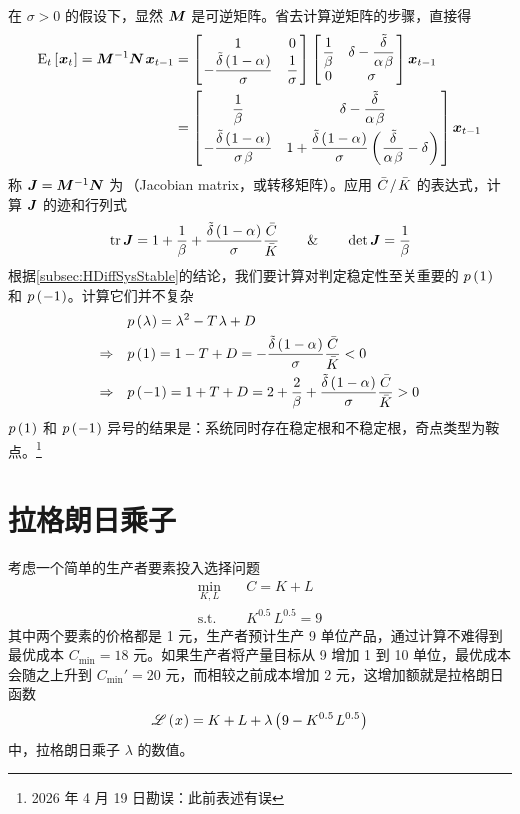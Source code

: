 在 \(\sigma>0\) 的假设下，显然 \(\bm{M}\) 是可逆矩阵。省去计算逆矩阵的步骤，直接得
\begin{align*}
    \mean_t\bks{\bs x_t}=\bs{M}\inv\bs{N}\,\bs x\lt&=
    \matbks{1&0\\-\dfrac{\tilde\delta\bka{1-\alpha}}{\sigma}&\dfrac1\sigma}\matbks{\dfrac1\beta&\delta-\dfrac{\tilde\delta}{\alpha\,\beta}\\0&\sigma}\bs x\lt\\
    &=\matbks{\dfrac1\beta&\delta-\dfrac{\tilde\delta}{\alpha\,\beta}\\[2ex]-\dfrac{\tilde\delta\bka{1-\alpha}}{\sigma\,\beta}&1+\dfrac{\tilde\delta\bka{1-\alpha}}{\sigma}\bka{\dfrac{\tilde\delta}{\alpha\,\beta}-\delta}}\bs x\lt
\end{align*}
称 \(\bm{J}=\bm{M}^{-1}\bm{N}\) 为\,（Jacobian matrix，或转移矩阵）。应用 \(\bar C{\mspace{2mu}}/{\mspace{2mu}}\bar K\) 的表达式，计算 \(\bm{J}\) 的迹和行列式
\begin{align*}
    \operatorname{tr}\bm{J}=1+\dfrac1\beta+\dfrac{\tilde\delta\left(\mspace{1mu}1-\alpha\mspace{1mu}\right)}{\sigma}\dfrac{\bar{C}}{\bar{K}}\qquad \& \qquad\det\bm{J}=\dfrac1\beta
\end{align*}
根据\ref{subsec:HDiffSysStable}的结论，我们要计算对判定稳定性至关重要的 \(p\left(\mspace{1mu}1\mspace{1mu}\right)\) 和 \(p\left(\mspace{1mu}-1\mspace{1mu}\right)\)。计算它们并不复杂
\begin{align*}
    &p\bka\lambda=\lambda^2-T\,\lambda+D\\
    \Rightarrow\quad &p\bka{1}=1-T+D=-\dfrac{\tilde\delta\bka{1-\alpha}}{\sigma}\dfracb{C}{K}<0\\
    \Rightarrow\quad &p\bka{-1}=1+T+D=2+\dfrac2\beta+\dfrac{\tilde\delta\bka{1-\alpha}}{\sigma}\dfracb{C}{K}>0
\end{align*}
\(p\left(\mspace{1mu}1\mspace{1mu}\right)\) 和 \(p\left(\mspace{1mu}-1\mspace{1mu}\right)\) 异号的结果是：系统同时存在稳定根和不稳定根，奇点类型为鞍点。\footnote{2026 年 4 月 19 日勘误：此前表述有误}



\BeginChapterAppendix

\section{拉格朗日乘子}\label{sec:LagMult}

考虑一个简单的生产者要素投入选择问题
\begin{align*}
    \min_{K,L} \quad & C=K+L\\
    \text{s.t.} \quad & K^{0.5}\,L^{0.5}=9
\end{align*}
其中两个要素的价格都是 1 元，生产者预计生产 9 单位产品，通过计算不难得到最优成本 \(C_{\min}=18\) 元。如果生产者将产量目标从 9 增加 1 到 10 单位，最优成本会随之上升到 \(C_{\min}'=20\) 元，而相较之前成本增加 2 元，这增加额就是拉格朗日函数
\begin{equation*}
    \scr L\bkx=K+L+\lambda\bka{9-K^{0.5}\,L^{0.5}}
\end{equation*}
中，拉格朗日乘子 \(\lambda\) 的数值。

